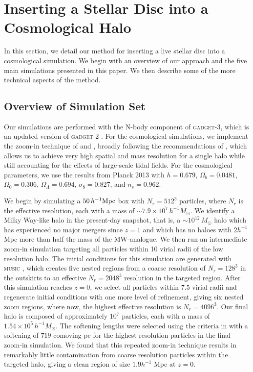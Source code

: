 \section{Inserting a Stellar Disc into a Cosmological Halo}

In this section, we detail our method for inserting a live stellar
disc into a cosmological simulation.  We begin with an overview of our
approach and the five main simulations presented in this paper.  We
then describe some of the more technical aspects of the method.

\subsection{Overview of Simulation Set} \label{sec:sim_overview} 

Our simulations are performed with the N-body component of
\textsc{gadget-3}, which is an updated version of \textsc{gadget-2}
\citep{springel_2005}.  For the cosmological simulations, we implement
the zoom-in technique of \citet{KatzQuasarZoom} and
\citet{NavarroWhiteZoom}, broadly following the recommendations of
\cite{onorbe_etal_2014}, which allows us to achieve very high spatial
and mass resolution for a single halo while still accounting for the
effects of large-scale tidal fields. For the cosmological parameters, we
use the results from Planck 2013 \citep{planck_2014} with $h=0.679$, $\Omega_b = 0.0481$, 
$\Omega_0 = 0.306$, $\Omega_\Lambda = 0.694$, $\sigma_8 = 0.827$, and $n_s = 0.962$. 

We begin by simulating a $50\,h^{-1} {\rm Mpc}$ box with $N_r=512^3$ particles, where $N_r$ is the effective resolution, each with a mass 
of $\sim 7.9\times 10^{7}\,h^{-1} M_\odot$.  We identify a Milky Way-like
halo in the present-day snapshot, that is, a $\sim 10^{12}\,M_\odot$
halo which has experienced no major mergers since $z=1$ and which has
no haloes with $2 h^{-1}$ Mpc more than half the mass of the MW-analogue. We then run an
intermediate zoom-in simulation targeting all particles within 10
virial radii of the low resolution halo.  The initial conditions for
this simulation are generated with \textsc{music} \citep{music}, which
creates five nested regions from a coarse resolution of $N_r=128^3$ in the
outskirts to an effective $N_r=2048^3$ resolution in the targeted region.
After this simulation reaches $z=0$, we select all particles within
7.5 virial radii and regenerate initial conditions with one more level
of refinement, giving six nested zoom regions, where now, the highest
effective resolution is $N_r=4096^3$. Our final halo is composed of
approximately $10^7$ particles, each with a mass of
$1.54\times 10^5\,h^{-1} M_\odot$. The softening lengths were selected using
the criteria in \citet{power_et_al_2003} with a softening of $719$ comoving pc for the highest resolution 
particles in the final zoom-in simulation. We found that this repeated zoom-in technique
results in remarkably little contamination from coarse resolution
particles within the targeted halo, giving a clean region of size $1.9 h^{-1}$ Mpc at $z=0$.


